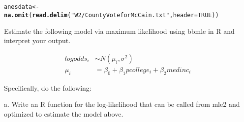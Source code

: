 \documentclass{article}\usepackage[]{graphicx}\usepackage[]{color}
\makeatletter
\newcommand{\hlnum}[1]{\textcolor[rgb]{0.686,0.059,0.569}{#1}}%
\newcommand{\hlstr}[1]{\textcolor[rgb]{0.192,0.494,0.8}{#1}}%
\newcommand{\hlstd}[1]{\textcolor[rgb]{0.345,0.345,0.345}{#1}}%
\newcommand{\hlkwb}[1]{\textcolor[rgb]{0.69,0.353,0.396}{#1}}%
\newcommand{\hlkwc}[1]{\textcolor[rgb]{0.333,0.667,0.333}{#1}}%
\newcommand{\hlkwd}[1]{\textcolor[rgb]{0.737,0.353,0.396}{\textbf{#1}}}%
\newenvironment{kframe}{%
 \def\at@end@of@kframe{}%
 \ifinner\ifhmode%
  \def\at@end@of@kframe{\end{minipage}}%
  \begin{minipage}{\columnwidth}%
 \fi\fi%
 \def\FrameCommand##1{\hskip\@totalleftmargin \hskip-\fboxsep
 \colorbox{shadecolor}{##1}\hskip-\fboxsep
     \hskip-\linewidth \hskip-\@totalleftmargin \hskip\columnwidth}%
 \MakeFramed {\advance\hsize-\width
   \@totalleftmargin\z@ \linewidth\hsize
   \@setminipage}}%
 {\par\unskip\endMakeFramed%
 \at@end@of@kframe}
\newenvironment{knitrout}{}{} %
\makeatother
\begin{document}
\section{}

\begin{knitrout}
\color{fgcolor}\begin{kframe}
\begin{alltt}
\hlstd{anesdata} \hlkwb{<-} \hlkwd{na.omit}\hlstd{(}\hlkwd{read.delim}\hlstd{(}\hlstr{"W2/County Vote for McCain.txt"}\hlstd{,} \hlkwc{header}\hlstd{=}\hlnum{TRUE}\hlstd{))}
\end{alltt}


{\ttfamily\noindent{}}

{\ttfamily\noindent\bfseries{}}\end{kframe}
\end{knitrout}


Estimate the following model via maximum likelihood using bbmle in R and interpret your output.

\begin{align}
logodds_i &\sim N(\mu_i, \sigma^2) \\
\mu_i &= \beta_0 + \beta_1 pcollege_i + \beta_2 medinc_i
\end{align}

Specifically, do the following:

a. Write an R function for the log-likelihood that can be called from mle2 and optimized to estimate the model above.
\end{document}
